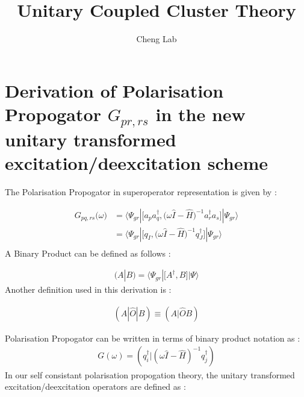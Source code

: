 \documentclass[11pt, oneside]{article}   	%
\title{Unitary Coupled Cluster Theory }
\author{Cheng Lab}
\begin{document}
\maketitle

\section{Derivation of Polarisation Propogator $G_{pr,rs}$ in  the new unitary transformed excitation/deexcitation scheme}
The Polarisation Propogator in superoperator representation is given by :

\begin{equation*}\label{eq:propogator}
  \begin{aligned}
    G_{pq,rs}\big(\omega\big)&=\big \langle \Psi_{gr} |\big[ a_p a_q^\dagger , \big(\omega \hat I-\hat H \big)^{-1} a_r^\dagger a_s \big] | \Psi_{gr}\big \rangle \\
   & =\big \langle \Psi_{gr} |\big[ q_I , \big(\omega \hat I-\hat H \big)^{-1} q_J^\dagger \big] | \Psi_{gr}\big \rangle \\ 
  \end{aligned}
\end{equation*}
A Binary Product can be defined as follows :

\begin{equation*}\label{eq:binary product}
  \begin{aligned}
    (A|B)=\big \langle \Psi_{gr}|\big[A^\dagger,B]|\Psi\rangle
  \end{aligned}
\end{equation*}
Another definition used in this derivation is :

\begin{equation*}\label{eq:superoperator}
  \begin{aligned}
    (A|\hat O |B)\equiv (A|\hat O B)
  \end{aligned}
\end{equation*}

Polarisation Propogator can be written in terms of binary product notation as :
\begin{equation*}\label{eq:superoperator}
  \begin{aligned}
    G(\omega)=(q_i^\dagger|(\omega \hat I - \hat H)^{-1}q_j^\dagger )
  \end{aligned}
\end{equation*}
In our self consistant polarisation propogation theory, the unitary transformed excitation/deexcitation operators are defined as :
\end{document}
